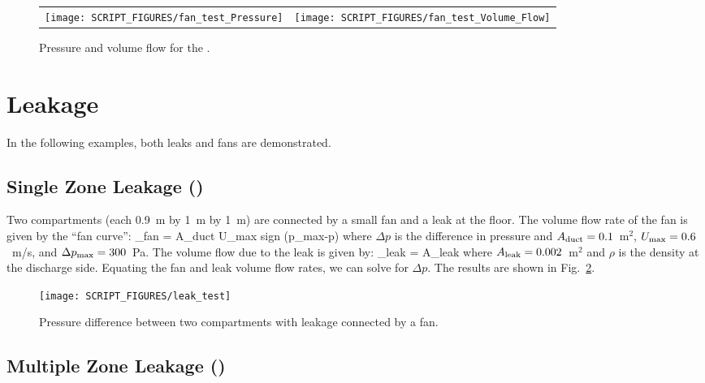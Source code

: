 \documentclass[11pt]{book}
\begin{document}
\begin{figure}[ht]
\begin{tabular*}{\textwidth}{lr}
\texttt{[image: SCRIPT\_FIGURES/fan\_test\_Pressure]} &
\texttt{[image: SCRIPT\_FIGURES/fan\_test\_Volume\_Flow]}
\end{tabular*}
\caption[Results of the  case]{Pressure and volume flow for the .}
\label{fan_test_fig}
\end{figure}


\section{Leakage}

In the following examples, both leaks and fans are demonstrated.

\subsection{Single Zone Leakage (\texorpdfstring{}{leak\_test})}
\label{single_zone_leak}
\label{leak_test}

Two compartments (each 0.9~m by 1~m by 1~m) are connected by a small fan and a leak at the floor. The volume flow rate of the fan is given by the ``fan curve'':
\be
  _{\hbox{\footnotesize fan}} = A_{\hbox{\footnotesize duct}}
  U_{\hbox{\footnotesize max}} \;
   \hbox{sign} (\Delta p_{\hbox{\footnotesize max}}-\Delta p)
\ee
where $\Delta p$ is the difference in pressure and $A_{\hbox{\scriptsize duct}}=0.1$~m$^2$, $U_{\hbox{\scriptsize max}}=0.6$~m/s, and $\Delta p_{\hbox{\scriptsize max}}=300$~Pa. The volume flow due to the leak is given by:
\be
   _{\hbox{\scriptsize leak}} = A_{\hbox{\scriptsize leak}} 
\ee
where $A_{\hbox{\scriptsize leak}}=0.002$~m$^2$ and $\rho$ is the density at the discharge side. Equating the fan and leak volume flow rates, we can solve for $\Delta p$. The results are shown in Fig.~\ref{leak_test_fig}.

\begin{figure}[ht]
\centering
\texttt{[image: SCRIPT\_FIGURES/leak\_test]}
\caption[The  case]{Pressure difference between two compartments with leakage connected by a fan.}
\label{leak_test_fig}
\end{figure}

\subsection{Multiple Zone Leakage (\texorpdfstring{}{leak\_test\_2})}
\label{leak_test_2}
\end{document}
